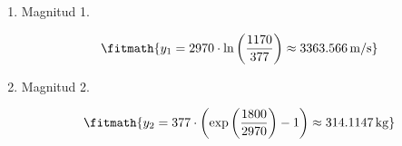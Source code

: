 \begin{enumerate}

\item Magnitud 1.

\[\fitmath{y_{1}=2970\cdot \ln\left(\frac{1170}{377}\right)\approx 3363.566\,\mathrm{m/s}}\]

\item Magnitud 2.

\[\fitmath{y_{2}=377\cdot \left(\exp\left(\frac{1800}{2970}\right)-1\right)\approx 314.1147\,\mathrm{kg}}\]

\end{enumerate}
